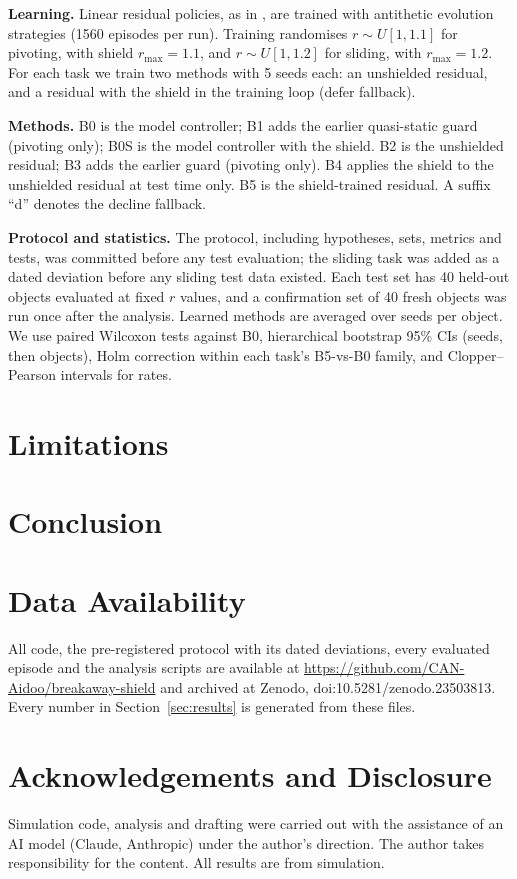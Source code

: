 \documentclass[10pt,twocolumn,letterpaper]{article}
\begin{document}
\textbf{Learning.} Linear residual policies, as in \cite{aidoo2026b}, are trained with antithetic evolution strategies (1560 episodes per run). Training randomises $r\sim U[1,1.1]$ for pivoting, with shield $r_{\max}=1.1$, and $r\sim U[1,1.2]$ for sliding, with $r_{\max}=1.2$. For each task we train two methods with 5 seeds each: an unshielded residual, and a residual with the shield in the training loop (defer fallback).

\textbf{Methods.} B0 is the model controller; B1 adds the earlier quasi-static guard (pivoting only); B0S is the model controller with the shield. B2 is the unshielded residual; B3 adds the earlier guard (pivoting only). B4 applies the shield to the unshielded residual at test time only. B5 is the shield-trained residual. A suffix ``d'' denotes the decline fallback.

\textbf{Protocol and statistics.} The protocol, including hypotheses, sets, metrics and tests, was committed before any test evaluation; the sliding task was added as a dated deviation before any sliding test data existed. Each test set has 40 held-out objects evaluated at fixed $r$ values, and a confirmation set of 40 fresh objects was run once after the analysis. Learned methods are averaged over seeds per object. We use paired Wilcoxon tests against B0, hierarchical bootstrap 95\% CIs (seeds, then objects), Holm correction within each task's B5-vs-B0 family, and Clopper--Pearson intervals for rates.



\section{Limitations}\label{sec:limits}


\section{Conclusion}


\section*{Data Availability}
All code, the pre-registered protocol with its dated deviations, every evaluated episode and the analysis scripts are available at \url{https://github.com/CAN-Aidoo/breakaway-shield} and archived at Zenodo, doi:10.5281/zenodo.23503813. Every number in Section~\ref{sec:results} is generated from these files.

\section*{Acknowledgements and Disclosure}
Simulation code, analysis and drafting were carried out with the assistance of an AI model (Claude, Anthropic) under the author's direction. The author takes responsibility for the content. All results are from simulation.

\small


\end{document}
